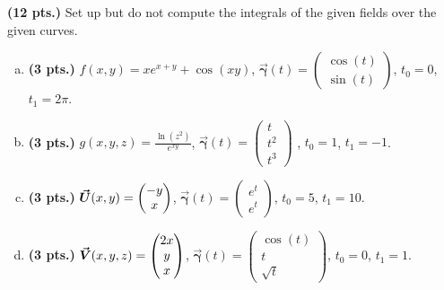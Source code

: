 \documentclass[12pt]{article} %
\newcommand{\curvegamma}{\boldsymbol{\vec{\gamma}}}
\begin{document}
\begin{problem}
\textbf{(12 pts.)} Set up but do not compute the integrals of the given fields over the given curves.
    \begin{enumerate}[(a)]
        \item \textbf{(3 pts.)} $f(x,y) = xe^{x+y}+\cos(xy)$, $\curvegamma(t) = \begin{pmatrix} \cos(t) \\ \sin(t) \end{pmatrix}$, $t_0 = 0$, $t_1=2\pi$.
        \item \textbf{(3 pts.)} $g(x,y,z) = \frac{\ln(z^2)}{e^{xy}}$, $\curvegamma(t) = \begin{pmatrix} t \\ t^2 \\ t^3 \end{pmatrix}$ , $t_0 = 1$, $t_1=-1$.
        \item \textbf{(3 pts.)} $\boldsymbol{\vec{U}}(x,y) = \begin{pmatrix} -y \\ x \end{pmatrix}$, $\curvegamma(t) = \begin{pmatrix} e^t \\ e^t \end{pmatrix}$, $t_0 = 5$, $t_1=10$.
        \item \textbf{(3 pts.)} $\boldsymbol{\vec{V}}(x,y,z) = \begin{pmatrix} 2x \\ y \\ x \end{pmatrix}$, $\curvegamma(t) = \begin{pmatrix} \cos(t) \\ t \\ \sqrt{t} \end{pmatrix}$, $t_0 = 0$, $t_1=1$.
    \end{enumerate}
\end{problem}
\end{document}
